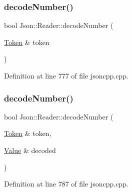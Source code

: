 \hypertarget{class_json_1_1_reader_a442d1f23edf0f4350f5eeab3ee3f7d46}{}\label{class_json_1_1_reader_a442d1f23edf0f4350f5eeab3ee3f7d46} 
\subsubsection{\texorpdfstring{decode\+Number()}{decodeNumber()}\hspace{0.1cm}{\footnotesize\ttfamily [3/4]}}
{\footnotesize\ttfamily bool Json\+::\+Reader\+::decode\+Number (\begin{DoxyParamCaption}\item[{\hyperlink{class_json_1_1_reader_1_1_token}{Token} \&}]{token }\end{DoxyParamCaption})\hspace{0.3cm}{\ttfamily [private]}}



Definition at line 777 of file jsoncpp.\+cpp.

\hypertarget{class_json_1_1_reader_a72f426ce3fa384d14aa10e9dd75618f0}{}\label{class_json_1_1_reader_a72f426ce3fa384d14aa10e9dd75618f0} 
\subsubsection{\texorpdfstring{decode\+Number()}{decodeNumber()}\hspace{0.1cm}{\footnotesize\ttfamily [4/4]}}
{\footnotesize\ttfamily bool Json\+::\+Reader\+::decode\+Number (\begin{DoxyParamCaption}\item[{\hyperlink{class_json_1_1_reader_1_1_token}{Token} \&}]{token,  }\item[{\hyperlink{class_json_1_1_value}{Value} \&}]{decoded }\end{DoxyParamCaption})\hspace{0.3cm}{\ttfamily [private]}}



Definition at line 787 of file jsoncpp.\+cpp.

\hypertarget{class_json_1_1_reader_aaf736937912f5c9b8d221e57f209e3e0}{}\label{class_json_1_1_reader_aaf736937912f5c9b8d221e57f209e3e0} 
